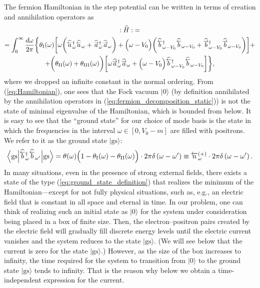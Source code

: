 \documentclass[12pt]{article}
\newcommand\beq{\begin{equation}}
\newcommand\eeq{\end{equation}}
\def\hataL{\widehat{ \overset{\smash{\raisebox{-0.45ex}{$\scriptstyle\leftarrow$}}}{a} }}
\def\hatbL{\widehat{ \overset{\smash{\raisebox{-0.5ex}{$\scriptstyle\leftarrow$}}}{b} }}
\def\hataR{\widehat{ \overset{\smash{\raisebox{-0.45ex}{$\scriptstyle\rightarrow$}}}{a} }}
\def\hatbR{\widehat{ \overset{\smash{\raisebox{-0.5ex}{$\scriptstyle\rightarrow$}}}{b} }}
\def\w{\omega}
\def\I{\mathrm{I}}
\def\II{\mathrm{II}}
\def\III{\mathrm{III}}
\numberwithin{equation}{section}
\begin{document}
The fermion Hamiltonian in the step potential can be written in terms of creation and annihilation operators as
\begin{gather}
\label{eq:Hamiltonian}
    :\widehat{H}: \;= 
    \\ \nonumber
    = 
    \int_{0}^{\infty}\frac{d\w}{2\pi}\bigg\{\theta_{\I}(\w)\bigg[\w\bigg(\hataL\phantom{\empty}^{\dagger}_{\w}\hataL_{\w} + \hataR\phantom{\empty}^{\dagger}_{\w}\hataR_{\w}  \bigg)  + \Big(\w-V_0\Big)\bigg(\hatbL\phantom{\empty}^{\dagger}_{\w-V_0}\hatbL_{\w-V_0} + \hatbR\phantom{\empty}^{\dagger}_{\w-V_0}\hatbR_{\w-V_0}  \bigg)\bigg] +
    \\ \nonumber
    +\bigg(\theta_{\II}(\w)+\theta_{\III}(\w)\bigg)\bigg[\w \hataR\phantom{\empty}^{\dagger}_{\w}\hataR_{\w} + \Big(\w-V_0\Big)\hatbL\phantom{\empty}^{\dagger}_{\w-V_0}\hatbL_{\w-V_0} \bigg]\bigg\},
\end{gather}    
where we dropped an infinite constant in the normal ordering. From (\ref{eq:Hamiltonian}), one sees that the Fock vacuum $\Big|0\Big\rangle$ (by definition annihilated by the annihilation operators in (\ref{eq:fermion_decomposition_static})) is not the state of minimal eigenvalue of the Hamiltonian, which is bounded from below. It is easy to see that the ``ground state'' for our choice of mode basis is the state in which the frequencies in the interval $\w\in\left[0,V_0-m\right]$ are filled with positrons. We refer to it as the ground state $\Big|\text{gs}\Big\rangle$:
\beq\label{eq:ground_state_definition}
    \Big\langle\text{gs}\Big|                       \hatbL\phantom{\empty}^{\dagger}_{\w}\hatbL_{\w'}\Big|\text{gs}\Big\rangle = \theta(\w)\Big(1-\theta_{\I}(\w)-\theta_{\II}(\w)\Big)\cdot2\pi\delta\left(\w-\w'\right) \equiv \overleftarrow{n}^{(+)}_{\w} \cdot2\pi\delta\left(\w-\w'\right). 
\eeq
In many situations, even in the presence of strong external fields, there exists a state of the type (\ref{eq:ground_state_definition}) that realizes the minimum of the Hamiltonian—except for not fully physical situations, such as, e.g., an electric field that is constant in all space and eternal in time. In our problem, one can think of realizing such an initial state as $\Big|0\Big\rangle$ for the system under consideration being placed in a box of finite size. Then, the electron–positron pairs created by the electric field will gradually fill discrete energy levels until the electric current vanishes and the system reduces to the state $\Big|\text{gs}\Big\rangle$. (We will see below that the current is zero for the state $\Big|\text{gs}\Big\rangle$.) However, as the size of the box increases to infinity, the time required for the system to transition from $\Big|0\Big\rangle$ to the ground state $\Big|\text{gs}\Big\rangle$ tends to infinity. That is the reason why below we obtain a time-independent expression for the current.  
\end{document}
